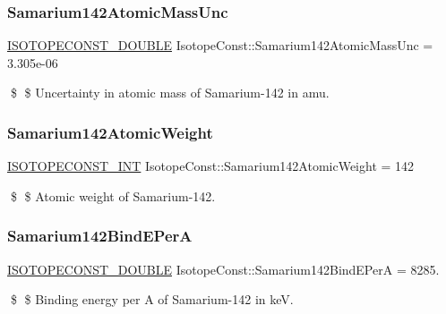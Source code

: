 \subsubsection{\texorpdfstring{Samarium142\+Atomic\+Mass\+Unc}{Samarium142AtomicMassUnc}}
{\footnotesize\ttfamily \mbox{\hyperlink{group___isotope_const-_macros_ga8f45a7272ce02c0b4c65c44636ed719a}{I\+S\+O\+T\+O\+P\+E\+C\+O\+N\+S\+T\+\_\+\+D\+O\+U\+B\+LE}} Isotope\+Const\+::\+Samarium142\+Atomic\+Mass\+Unc = 3.\+305e-\/06}

\$ \$ Uncertainty in atomic mass of Samarium-\/142 in amu. \mbox{\label{group___isotope_const-_samarium-_sm142_gacc6b9476e607a94a47002ca6979b9c96}} 
\subsubsection{\texorpdfstring{Samarium142\+Atomic\+Weight}{Samarium142AtomicWeight}}
{\footnotesize\ttfamily \mbox{\hyperlink{group___isotope_const-_macros_ga5f18360b3e99483a35c32d789e62621c}{I\+S\+O\+T\+O\+P\+E\+C\+O\+N\+S\+T\+\_\+\+I\+NT}} Isotope\+Const\+::\+Samarium142\+Atomic\+Weight = 142}

\$ \$ Atomic weight of Samarium-\/142. \mbox{\label{group___isotope_const-_samarium-_sm142_ga501bfde3ac5484c4cfee12f0d35a3e6f}} 
\subsubsection{\texorpdfstring{Samarium142\+Bind\+E\+PerA}{Samarium142BindEPerA}}
{\footnotesize\ttfamily \mbox{\hyperlink{group___isotope_const-_macros_ga8f45a7272ce02c0b4c65c44636ed719a}{I\+S\+O\+T\+O\+P\+E\+C\+O\+N\+S\+T\+\_\+\+D\+O\+U\+B\+LE}} Isotope\+Const\+::\+Samarium142\+Bind\+E\+PerA = 8285.}

\$ \$ Binding energy per A of Samarium-\/142 in keV. \mbox{\label{group___isotope_const-_samarium-_sm142_ga3d67ec066da0d4513534e310c85f6d3f}} 
